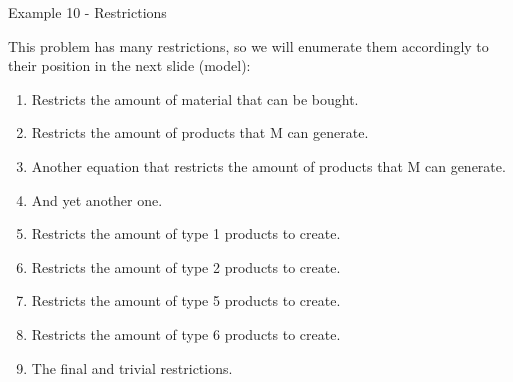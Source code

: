 \begin{frame}{Example 10 - Restrictions}

This problem has many restrictions, so we will enumerate them accordingly to
their position in the next slide (model):

\begin{enumerate}
\item Restricts the amount of material that can be bought.
\item Restricts the amount of products that M can generate.
\item Another equation that restricts the amount of products that M can generate.
\item And yet another one.
\item Restricts the amount of type 1 products to create.
\item Restricts the amount of type 2 products to create.
\item Restricts the amount of type 5 products to create.
\item Restricts the amount of type 6 products to create.
\item The final and trivial restrictions.
\end{enumerate}

\end{frame}
